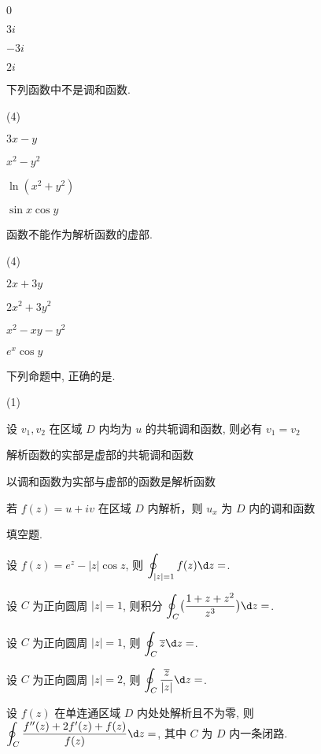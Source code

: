 \begin{homework}
\begin{subex}
\begin{exchoice}
      \item $0$
      \item $3i$
      \item $-3i$
      \item $2i$
    \end{exchoice}
    \item 下列函数中\fillbrace{}不是调和函数.
    \begin{exchoice}(4)
      \item $3x-y$
      \item $x^2-y^2$
      \item $\ln(x^2+y^2)$
      \item $\sin x\cos y$
    \end{exchoice}
    \item 函数\fillbrace{}不能作为解析函数的虚部.
    \begin{exchoice}(4)
      \item $2x+3y$
      \item $2x^2+3y^2$
      \item $x^2-xy-y^2$
      \item $e^x\cos y$
    \end{exchoice}
    \item 下列命题中, 正确的是\fillbrace{}.
    \begin{exchoice}(1)
      \item 设 $v_1,v_2$ 在区域 $D$ 内均为 $u$ 的共轭调和函数, 则必有 $v_1=v_2$
      \item 解析函数的实部是虚部的共轭调和函数
      \item 以调和函数为实部与虚部的函数是解析函数
      \item 若 $f(z)=u+iv$ 在区域 $D$ 内解析，则 $u_x$ 为 $D$ 内的调和函数
    \end{exchoice}
  \end{subex}
  \item 填空题.
  \begin{subex}
    \item 设 $f(z)=e^z-|z|\cos z$, 则 $\displaystyle\oint_{|z|=1}f(z)\d z=$\fillblank{}.
    \item 设 $C$ 为正向圆周 $|z|=1$, 则积分 $\displaystyle\oint_C\bigl(\frac{1+z+z^2}{z^3}\bigr)\d z=$\fillblank{}.
    \item 设 $C$ 为正向圆周 $|z|=1$, 则 $\displaystyle\oint_C\ov z\d z=$\fillblank{}.
    \item 设 $C$ 为正向圆周 $|z|=2$, 则 $\displaystyle\oint_C\dfrac{\ov z}{|z|}\d z=$\fillblank{}.
    \item 设 $f(z)$ 在单连通区域 $D$ 内处处解析且不为零, 则 $\displaystyle\oint_C\frac{f''(z)+2f'(z)+f(z)}{f(z)}\d z=$\fillblank{}, 其中 $C$ 为 $D$ 内一条闭路.

\end{subex}
\end{homework}
